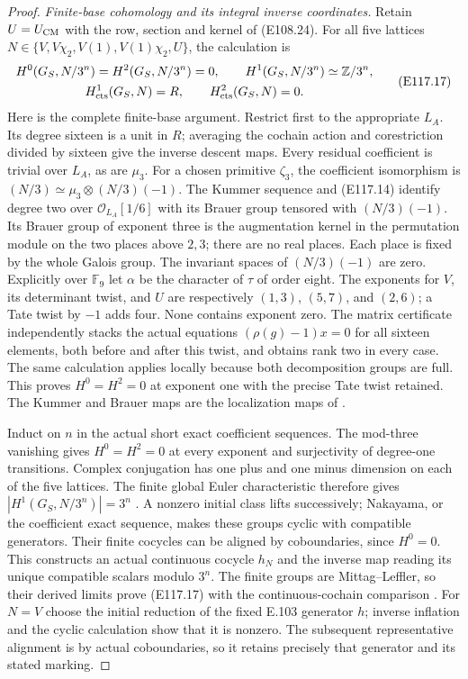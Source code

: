 \begin{proof}
\emph{Finite-base cohomology and its integral inverse coordinates.}
Retain $U=U_{\rm CM}$ with the row, section and kernel of
(E108.24).  For all five lattices
$N\in\{V,V\chi_2,V(1),V(1)\chi_2,U\}$, the calculation is
\[
 \begin{gathered}
 H^0(G_S,N/3^n)=H^2(G_S,N/3^n)=0,
 \qquad H^1(G_S,N/3^n)\simeq\mathbb Z/3^n,\\
 H^1_{\rm cts}(G_S,N)=R,\qquad
 H^2_{\rm cts}(G_S,N)=0.
 \end{gathered}
 \tag{E117.17}
\]
Here is the complete finite-base argument.  Restrict first to
the appropriate $L_A$.  Its degree sixteen is a unit in $R$;
averaging the cochain action and corestriction divided by
sixteen give the inverse descent maps.  Every residual
coefficient is trivial over $L_A$, as are $\mu_3$.
For a chosen primitive $\zeta_3$, the coefficient isomorphism
is $(N/3)\simeq\mu_3\otimes(N/3)(-1)$.  The Kummer
sequence and (E117.14) identify degree two over
$\mathcal O_{L_A}[1/6]$ with its Brauer group tensored with
$(N/3)(-1)$.  Its Brauer group of exponent three is the
augmentation kernel in the permutation module on the two
places above $2,3$; there are no real places.  Each place
is fixed by the whole Galois group.  The invariant spaces
of $(N/3)(-1)$ are zero.  Explicitly over $\mathbb F_9$ let
$\alpha$ be the character of $\tau$ of order eight.
The exponents for $V$, its determinant twist, and $U$ are
respectively
$(1,3)$, $(5,7)$, and $(2,6)$; a Tate twist by $-1$
adds four.  None contains exponent zero.  The matrix
certificate independently stacks the actual equations
$(\rho(g)-1)x=0$ for all sixteen elements, both before and
after this twist, and obtains rank two in every case.
The same calculation applies locally because both
decomposition groups are full.  This proves $H^0=H^2=0$
at exponent one with the precise Tate twist retained.
The Kummer and Brauer maps are the localization maps of
\cite[II.0.1(f), II.1.7(b), II.2.9]{E_MilneADT}.

Induct on $n$ in the actual short exact coefficient sequences.
The mod-three vanishing gives $H^0=H^2=0$ at every exponent
and surjectivity of degree-one transitions.  Complex
conjugation has one plus and one minus dimension on each
of the five lattices.  The finite global Euler characteristic
therefore gives $|H^1(G_S,N/3^n)|=3^n$
\cite[I.4.15; I.5.1 and proof]{E_MilneADT}.  A nonzero initial
class lifts successively; Nakayama, or the coefficient exact
sequence, makes these groups cyclic with compatible
generators.  Their finite cocycles can be aligned by
coboundaries, since $H^0=0$.  This constructs an actual
continuous cocycle $h_N$ and the inverse map reading its
unique compatible scalars modulo $3^n$.  The finite groups
are Mittag--Leffler, so their derived limits prove (E117.17)
with the continuous-cochain comparison
\cite[Proposition1.6, Theorem2.2]{E_JannsenContinuous}.
For $N=V$ choose the initial reduction of the fixed E.103
generator $h$; inverse inflation and the cyclic calculation
show that it is nonzero.  The subsequent representative
alignment is by actual coboundaries, so it retains precisely
that generator and its stated marking.


\end{proof}
